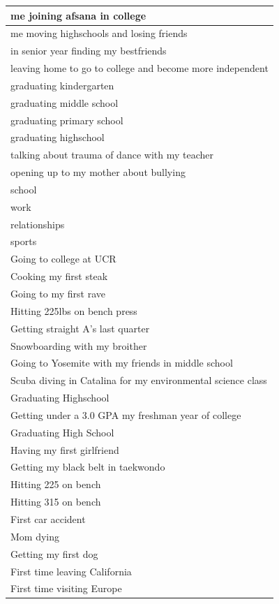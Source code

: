 \documentclass[
  .7em,
  letterpaper,
  DIV=11,
  numbers=noendperiod]{scrartcl}
\begin{document}
\begin{table}
\begin{tabular}{l}
\hline
me joining afsana in college\\
\hline
me moving highschools and losing friends\\
\hline
in senior year finding my bestfriends\\
\hline
leaving home to go to college and become more independent\\
\hline
graduating kindergarten\\
\hline
graduating middle school\\
\hline
graduating primary school\\
\hline
graduating highschool\\
\hline
talking about trauma of dance with my teacher\\
\hline
opening up to my mother about bullying\\
\hline
school\\
\hline
work\\
\hline
relationships\\
\hline
sports\\
\hline
Going to college at UCR\\
\hline
Cooking my first steak\\
\hline
Going to my first rave\\
\hline
Hitting 225lbs on bench press\\
\hline
Getting straight A's last quarter\\
\hline
Snowboarding with my broither\\
\hline
Going to Yosemite with my friends in middle school\\
\hline
Scuba diving in Catalina for my environmental science class\\
\hline
Graduating Highschool\\
\hline
Getting under a 3.0 GPA my freshman year of college\\
\hline
Graduating High School\\
\hline
Having my first girlfriend\\
\hline
Getting my black belt in taekwondo\\
\hline
Hitting 225 on bench\\
\hline
Hitting 315 on bench\\
\hline
First car accident\\
\hline
Mom dying\\
\hline
Getting my first dog\\
\hline
First time leaving California\\
\hline
First time visiting Europe\\

\end{tabular}
\end{table}
\end{document}
